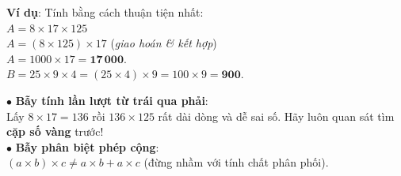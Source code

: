 \documentclass[14pt,a4paper,oneside]{extbook}
\begin{document}
\noindent
\begin{minipage}[t]{0.53\textwidth}
  \begin{tcolorbox}[
    enhanced,
    title={\footnotesize\bfseries\color{white}\faCheckCircle\ Ví dụ thực hành chuẩn mực},
    colback=green!2!white,
    colframe=green!60!black,
    arc=2.5mm, boxrule=0.8pt, top=1.8mm, bottom=1.8mm, left=2.2mm, right=2.2mm
  ]
    \footnotesize
    \textbf{Ví dụ}: Tính bằng cách thuận tiện nhất:\\
    $A = 8 \times 17 \times 125$\\
    $A = (8 \times 125) \times 17$ \quad (\textit{giao hoán \& kết hợp})\\
    $A = 1000 \times 17 = \mathbf{17\,000}$.\\[1mm]
    $B = 25 \times 9 \times 4 = (25 \times 4) \times 9 = 100 \times 9 = \mathbf{900}$.
  \end{tcolorbox}
\end{minipage}%
\hfill
\begin{minipage}[t]{0.45\textwidth}
  \begin{tcolorbox}[
    enhanced,
    title={\footnotesize\bfseries\color{white}\faExclamationTriangle\ Mẹo tránh bẫy trắc nghiệm},
    colback=red!2!white,
    colframe=red!70!black,
    arc=2.5mm, boxrule=0.8pt, top=1.8mm, bottom=1.8mm, left=2.2mm, right=2.2mm
  ]
    \footnotesize
    $\bullet$ \textbf{Bẫy tính lần lượt từ trái qua phải}:\\
    Lấy $8 \times 17 = 136$ rồi $136 \times 125$ rất dài dòng và dễ sai số. Hãy luôn quan sát tìm \textbf{cặp số vàng} trước!\\
    $\bullet$ \textbf{Bẫy phân biệt phép cộng}:\\
    $(a \times b) \times c \neq a \times b + a \times c$ (đừng nhầm với tính chất phân phối).
  \end{tcolorbox}
\end{minipage}
\end{document}

